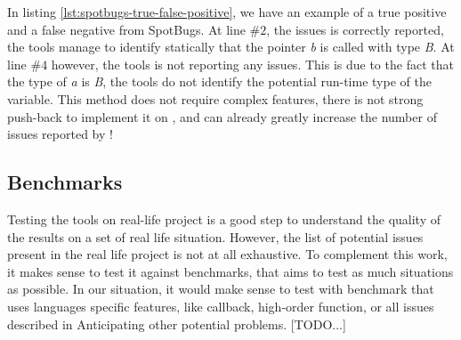 \begin{enumerate}
	
	
	In listing \ref{lst:spotbugs-true-false-positive}, we have an example of a true positive and a false negative from SpotBugs. At line $\#2$, the issues is correctly reported, the tools manage to identify statically that the pointer \emph{b} is called with type \emph{B}. At line $\#4$ however, the tools is not reporting any issues. This is due to the fact that the type of \emph{a} is \emph{B}, the tools do not identify the potential run-time type of the variable.\newline
	This method does not require complex features, there is not strong push-back to implement it on \slang, and can already greatly increase the number of issues reported by \slang!
\end{enumerate}

\subsection{Benchmarks}
\label{subsec:benchmarks}

Testing the tools on real-life project is a good step to understand the quality of the results on a set of real life situation. 
However, the list of potential issues present in the real life project is not at all exhaustive. To complement this work, it makes sense to test it against benchmarks, that aims to test as much situations as possible. 
In our situation, it would make sense to test with benchmark that uses languages specific features, like callback, high-order function, or all issues described in Anticipating other potential problems. [TODO...]




